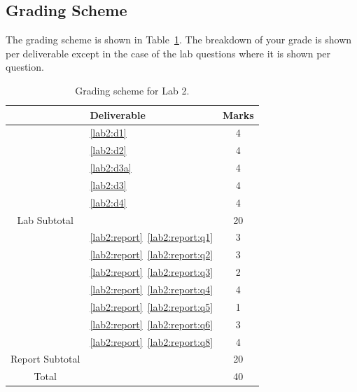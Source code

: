 \subsection{Grading Scheme}
The grading scheme is shown in Table~\ref{tab:lab2:grading}. The breakdown of
your grade is shown per deliverable except in the case of the lab
questions where it is shown per question.
%
\begin{table}
\centering
\begin{tabular}{c|l|c}
        & Deliverable           & Marks  \\ \hline
        & \ref{lab2:d1}         & 4       \\ \hline
        & \ref{lab2:d2}         & 4       \\ \hline
        & \ref{lab2:d3a}        & 4       \\ \hline
        & \ref{lab2:d3}         & 4       \\ \hline
        & \ref{lab2:d4}         & 4       \\ \hhline{=|=|=}
Lab Subtotal&                       & 20      \\ \hhline{=|=|=}
        & \ref{lab2:report}~\ref{lab2:report:q1}  & 3       \\ \hline
        & \ref{lab2:report}~\ref{lab2:report:q2}  & 3       \\ \hline
        & \ref{lab2:report}~\ref{lab2:report:q3}  & 2       \\ \hline
        & \ref{lab2:report}~\ref{lab2:report:q4}  & 4       \\ \hline
        & \ref{lab2:report}~\ref{lab2:report:q5}  & 1      \\ \hline
        & \ref{lab2:report}~\ref{lab2:report:q6}  & 3      \\ \hline
        & \ref{lab2:report}~\ref{lab2:report:q8}  & 4       \\ \hhline{=|=|=}
Report Subtotal&  & 20 \\ \hhline{=|=|=}
  Total &                       & 40
\end{tabular}
\caption[Grading Scheme for Lab 2]{Grading scheme for Lab 2.}
\label{tab:lab2:grading}
\end{table}
%
